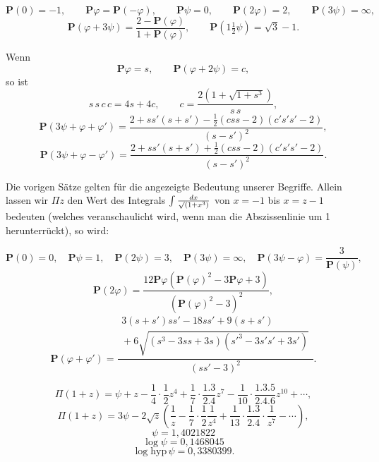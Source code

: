 \clearpage
{}%

\[
\boldsymbol{P}(0)=-1,\qquad \boldsymbol{P}\varphi=\boldsymbol{P}(-\varphi),\qquad
\boldsymbol{P}\psi=0,\qquad \boldsymbol{P}(2\varphi)=2,\qquad \boldsymbol{P}(3\psi)=\infty,
\]
\[
\boldsymbol{P}(\varphi+3\psi)=\frac{2-\boldsymbol{P}(\varphi)}{1+\boldsymbol{P}(\varphi)},
\qquad \boldsymbol{P}(1\tfrac12\psi)=\sqrt{3}-1.
\]

\noindent Wenn
\[
\boldsymbol{P}\varphi=s,\qquad \boldsymbol{P}(\varphi+2\psi)=c,
\]
\noindent so ist
\[
s\,s\,c\,c=4s+4c,\qquad c=\frac{2(1+\sqrt{1+s^3})}{s\,s},
\]
\[
\boldsymbol{P}(3\psi+\varphi+\varphi')=
\frac{2+s s'(s+s')-\tfrac12(c s s-2)(c' s' s'-2)}{(s-s')^2},
\]
\[
\boldsymbol{P}(3\psi+\varphi-\varphi')=
\frac{2+s s'(s+s')+\tfrac12(c s s-2)(c' s' s'-2)}{(s-s')^2}.
\]



Die vorigen Sätze gelten für die angezeigte Bedeutung unserer Begriffe. Allein lassen wir
$\Pi z$ den Wert des Integrals $\int \frac{dx}{\mathord{\surd}(1+x^3)}$ von $x=-1$ bis $x=z-1$
bedeuten (welches veranschaulicht wird, wenn man die Abszissenlinie um 1 herunterrückt),
so wird:

\[
\boldsymbol{P}(0)=0,\quad \boldsymbol{P}\psi=1,\quad \boldsymbol{P}(2\psi)=3,\quad
\boldsymbol{P}(3\psi)=\infty,\quad \boldsymbol{P}(3\psi-\varphi)=\frac{3}{\boldsymbol{P}(\psi)},
\]
\[
\boldsymbol{P}(2\varphi)=
\frac{12\boldsymbol{P}\varphi\left(\boldsymbol{P}(\varphi)^2-3\boldsymbol{P}\varphi+3\right)}
{\left(\boldsymbol{P}(\varphi)^2-3\right)^2},
\]
\[
\boldsymbol{P}(\varphi+\varphi')=
\frac{\begin{gathered}3(s+s')s s'-18 s s'+9(s+s')\\{}+6\sqrt{(s^3-3ss+3s)(s'^3-3s's'+3s')}\end{gathered}}{(ss'-3)^2}.
\]



\[
\Pi(1+z)=\psi+z-\frac14\cdot\frac12 z^4+\frac17\cdot\frac{1.3}{2.4}z^7
-\frac{1}{10}\cdot\frac{1.3.5}{2.4.6}z^{10}+\cdots,
\]
\[
\Pi(1+z)=3\psi-2\sqrt{z}\left(\frac1z-\frac17\cdot\frac12\frac{1}{z^4}
+\frac{1}{13}\cdot\frac{1.3}{2.4}\cdot\frac{1}{z^7}-\cdots\right),
\]
\[
\psi=1{,}4021822
\]
\[
\log\psi=0{,}1468045
\]
\[
\log\mathrm{hyp}\,\psi=0{,}3380399.
\]


